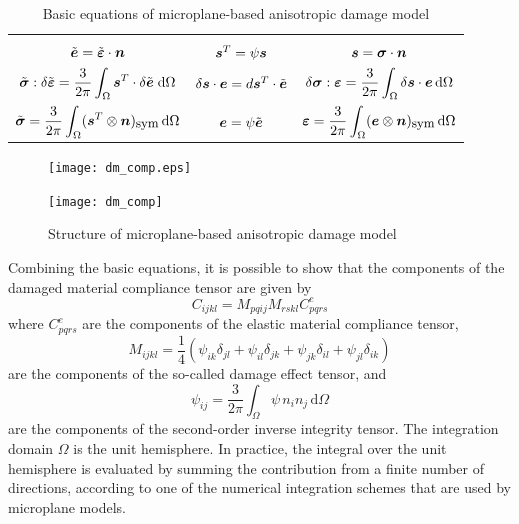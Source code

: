 \documentclass[a4paper]{article}
\newcommand{\mbf}[1]{\mbox{\boldmath$#1$}}
\newcommand{\ve}{\mbf{e}}%
\newcommand{\vet}{\tilde{\ve}}
\newcommand{\veps}{\mbf{\varepsilon}}  %
\newcommand{\vsig}{\mbf{\sigma}}%
\newcommand{\vs}{\mbf{s}}%
\newcommand{\vepst}{\tilde{\veps}}
\newcommand{\vst}{\mbf{s}^T}%
\newcommand{\vsigt}{\tilde{\vsig}}
\newcommand{\dvepst}{\delta\tilde{\veps}}
\newcommand{\dvet}{\delta\vet}
\newcommand{\dvs}{\delta\vs}
\newcommand{\dvsig}{\delta\vsig}
\newcommand{\dO}{\,\mbox{d}\Omega}
\newcommand{\sym}{_{\mbox{\small sym}}}
\newcommand{\quarter}{\mbox{$\frac{1}{4}$}}
\begin{document}
\begin{table}[!htb]
\caption{Basic equations of microplane-based anisotropic damage model}
\label{tab2}
\begin{center}
\begin{tabular}{|c|c|c|}
\hline
&&\\
$\vet=\vepst\cdot\mbf{n}$
&
$\vst = \psi\vs$
&
$\vs=\vsig\cdot\mbf{n}$
\\[5mm]
$\vsigt:\dvepst = \displaystyle\frac{3}{2\pi} \int_{\Omega}\vst\cdot\dvet\;\mbox{d}\Omega$
&
$\dvs\cdot\ve=d\vst\cdot\vet$
&
$\dvsig:\veps = \displaystyle\frac{3}{2\pi} \int_{\Omega}\dvs\cdot\ve\dO$
\\[5mm]
$\vsigt = \displaystyle\frac{3}{2\pi}\int_\Omega (\vst\otimes\mbf{n})\sym\dO$
&
$\ve=\psi\vet$
&
$\veps = \displaystyle\frac{3}{2\pi}\int_\Omega (\ve\otimes\mbf{n})\sym\dO$
\\[5mm]
\hline
\end{tabular}
\end{center}
\end{table}

\begin{figure}[!htb]
\begin{htmlonly}
  \centerline{\texttt{[image: dm\_comp.eps]}}
\end{htmlonly}
 \centerline{\texttt{[image: dm\_comp]}}
\caption{Structure of microplane-based anisotropic damage model}
\label{ff4}
\end{figure}

Combining the basic equations, it is possible to show that the
components of the damaged
material compliance tensor are given by
\begin{equation}
\label{damcom}
C_{ijkl}=M_{pqij}M_{rskl}C^e_{pqrs}
\end{equation}
where $C^e_{pqrs}$ are the components of the elastic material compliance tensor,
\begin{equation}
\label{ee27}
M_{ijkl} = \quarter\left(
\psi_{ik}\delta_{jl}+\psi_{il}\delta_{jk}+\psi_{jk}\delta_{il}+\psi_{jl}\delta_{ik}\right)
\end{equation}
are the components of the so-called damage effect tensor, and
\begin{equation}
\label{ee24}
\psi_{ij} = \frac{3}{2\pi}\int_\Omega \psi\, n_i n_j \dO
\end{equation}
are the components of the second-order inverse integrity tensor.
The integration domain $\Omega$ is the unit hemisphere.
In practice, the integral over the unit hemisphere is evaluated by
summing the contribution from a finite number of directions, according
to one of the numerical integration schemes that are used by microplane
models.
\end{document}
